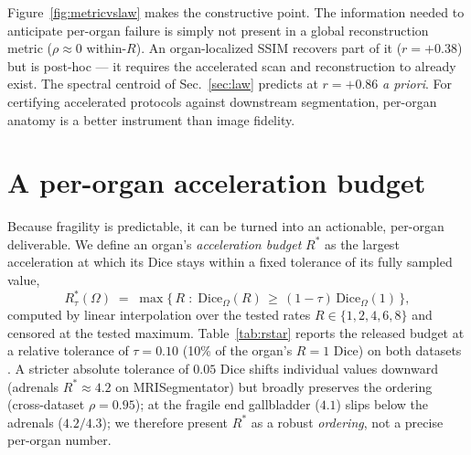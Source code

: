 \documentclass[10pt,twocolumn,letterpaper]{article}
\begin{document}
Figure~\ref{fig:metricvslaw} makes the constructive point. The information needed to anticipate per-organ failure is simply not present in a global reconstruction metric ($\rho \approx 0$ within-$R$). An organ-localized SSIM recovers part of it ($r=+0.38$) but is post-hoc --- it requires the accelerated scan and reconstruction to already exist. The spectral centroid of Sec.~\ref{sec:law} predicts at $r=+0.86$ \emph{a priori}. For certifying accelerated protocols against downstream segmentation, per-organ anatomy is a better instrument than image fidelity.

\section{A per-organ acceleration budget}
\label{sec:budget}

Because fragility is predictable, it can be turned into an actionable, per-organ deliverable. We define an organ's \emph{acceleration budget} $R^\ast$ as the largest acceleration at which its Dice stays within a fixed tolerance of its fully sampled value,
\begin{equation}
R^\ast_{\tau}(\Omega) \;=\; \max\bigl\{\, R \;:\; \mathrm{Dice}_\Omega(R) \,\ge\, (1-\tau)\,\mathrm{Dice}_\Omega(1) \,\bigr\},
\label{eq:rstar}
\end{equation}
computed by linear interpolation over the tested rates $R\in\{1,2,4,6,8\}$ and censored at the tested maximum. Table~\ref{tab:rstar} reports the released budget at a relative tolerance of $\tau=0.10$ (10\% of the organ's $R{=}1$ Dice) on both datasets \cite{mrisegmentator2024,amos2022}. A stricter absolute tolerance of $0.05$ Dice shifts individual values downward (adrenals $R^\ast\!\approx\!4.2$ on MRISegmentator) but broadly preserves the ordering (cross-dataset $\rho{=}0.95$); at the fragile end gallbladder ($4.1$) slips below the adrenals ($4.2/4.3$); we therefore present $R^\ast$ as a robust \emph{ordering}, not a precise per-organ number.
\end{document}
